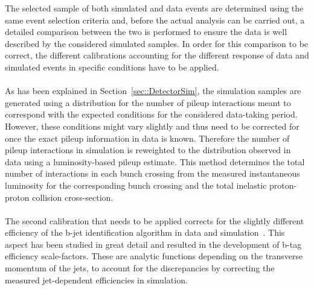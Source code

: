The selected sample of both simulated and data events are determined using the same event selection criteria and, before the actual analysis can be carried out, a detailed comparison between the two is performed to ensure the data is well described by the considered simulated samples.
In order for this comparison to be correct, the different calibrations accounting for the different response of data and simulated events in specific conditions have to be applied.
\\
\\
As has been explained in Section~\ref{sec::DetectorSim}, the simulation samples are generated using a distribution for the number of pileup interactions meant to correspond with the expected conditions for the considered data-taking period. However, these conditions might vary slightly and thus need to be corrected for once the exact pileup information in data is known.
Therefore the number of pileup interactions in simulation is reweighted to the distribution observed in data using a luminosity-based pileup estimate.
This method determines the total number of interactions in each bunch crossing from the measured instantaneous luminosity for the corresponding bunch crossing and the total inelastic proton-proton collision cross-section.
\\
\\
The second calibration that needs to be applied corrects for the slightly different efficiency of the b-jet identification algorithm in data and simulation~\cite{BTagSF}.
This aspect has been studied in great detail and resulted in the development of b-tag efficiency scale-factors. These are analytic functions depending on the transverse momentum of the jets, to account for the discrepancies by correcting the measured jet-dependent efficiencies in simulation.
